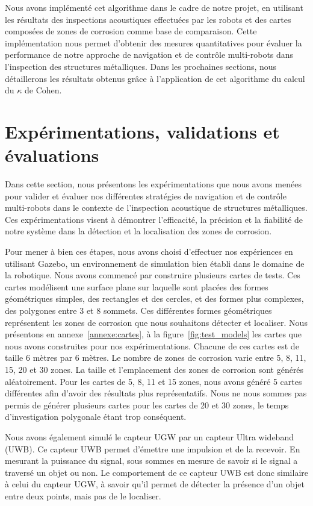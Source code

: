 \documentclass[francais,RandD]{rapportPFE}
\begin{document}
			Nous avons implémenté cet algorithme dans le cadre de notre projet, en utilisant les résultats des inspections acoustiques effectuées par les robots et des cartes composées de zones de corrosion comme base de comparaison.
			Cette implémentation nous permet d'obtenir des mesures quantitatives pour évaluer la performance de notre approche de navigation et de contrôle multi-robots dans l'inspection des structures métalliques.
			Dans les prochaines sections, nous détaillerons les résultats obtenus grâce à l'application de cet algorithme du calcul du $\kappa$ de Cohen.
	\section{Expérimentations, validations et évaluations}
		Dans cette section, nous présentons les expérimentations que nous avons menées pour valider et évaluer nos différentes stratégies de navigation et de contrôle multi-robots dans le contexte de l'inspection acoustique de structures métalliques.
		Ces expérimentations visent à démontrer l'efficacité, la précision et la fiabilité de notre système dans la détection et la localisation des zones de corrosion.

		Pour mener à bien ces étapes, nous avons choisi d'effectuer nos expériences en utilisant Gazebo, un environnement de simulation bien établi dans le domaine de la robotique.
		Nous avons commencé par construire plusieurs cartes de tests.
		Ces cartes modélisent une surface plane sur laquelle sont placées des formes géométriques simples, des rectangles et des cercles, et des formes plus complexes, des polygones entre 3 et 8 sommets.
		Ces différentes formes géométriques représentent les zones de corrosion que nous souhaitons détecter et localiser.
		Nous présentons en annexe~\ref{annexe:cartes}, à la figure~\ref{fig:test_models} les cartes que nous avons construites pour nos expérimentations.
		Chacune de ces cartes est de taille 6 mètres par 6 mètres.
		Le nombre de zones de corrosion varie entre 5, 8, 11, 15, 20 et 30 zones.
		La taille et l'emplacement des zones de corrosion sont générés aléatoirement.
		Pour les cartes de 5, 8, 11 et 15 zones, nous avons généré 5 cartes différentes afin d'avoir des résultats plus représentatifs.
		Nous ne nous sommes pas permis de générer plusieurs cartes pour les cartes de 20 et 30 zones, le temps d'investigation polygonale étant trop conséquent.

		Nous avons également simulé le capteur UGW par un capteur Ultra wideband (UWB).
		Ce capteur UWB permet d'émettre une impulsion et de la recevoir.
		En mesurant la puissance du signal, sous sommes en mesure de savoir si le signal a traversé un objet ou non.
		Le comportement de ce capteur UWB est donc similaire à celui du capteur UGW, à savoir qu'il permet de détecter la présence d'un objet entre deux points, mais pas de le localiser.
\end{document}
